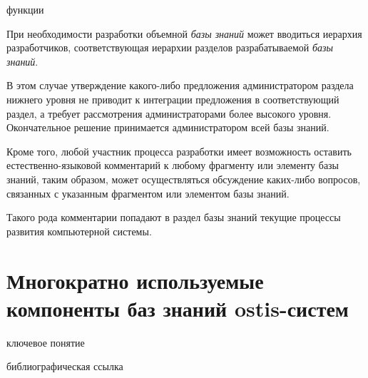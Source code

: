 \begin{SCn}
\begin{scnrelfromset}{функции}
\end{scnrelfromset}

\end{SCn}

При необходимости разработки объемной \textit{базы знаний} может вводиться иерархия разработчиков, соответствующая иерархии разделов разрабатываемой \textit{базы знаний}.

В этом случае утверждение какого-либо предложения администратором раздела нижнего уровня не приводит к интеграции предложения в соответствующий раздел, а требует рассмотрения администраторами более высокого уровня. Окончательное решение принимается администратором всей базы знаний.

Кроме того, любой участник процесса разработки имеет возможность оставить естественно-языковой комментарий к любому фрагменту или элементу базы знаний, таким образом, может осуществляться обсуждение каких-либо вопросов, связанных с указанным фрагментом или элементом базы знаний. 

Такого рода комментарии попадают в раздел базы знаний текущие процессы развития компьютерной системы.

\section{Многократно используемые компоненты баз знаний ostis-систем}
\label{sc_kb_design_components}

\begin{SCn}
	\begin{scnrelfromlist}{ключевое понятие}
	\end{scnrelfromlist}
\end{SCn}

\begin{SCn}
	\begin{scnrelfromlist}{библиографическая ссылка}
	\end{scnrelfromlist}
\end{SCn}

